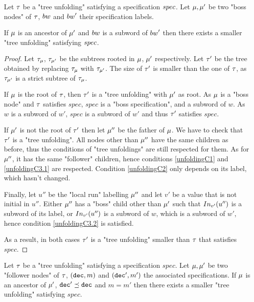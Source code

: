 \begin{lemma}
	Let $\tau$ be a "tree unfolding" satisfying a specification $\spec$.
	Let $\mu, \mu'$ be two "boss nodes" of $\tau$, $\bossspec$ and $\bossspec'$ their specification labels.
	
	If $\mu$ is an ancestor of $\mu'$ and $\bossspec$ is a subword of $\bossspec'$ then there exists a smaller "tree unfolding" satisfying $\spec$.  
\end{lemma}

\ifproofs
\begin{proof}
	Let $\tau_{\mu}$, $\tau_{\mu'}$ be the subtrees rooted in $\mu$, $\mu'$ respectively. 
	Let $\tau'$ be the tree obtained by replacing $\tau_{\mu}$ with $\tau_{\mu'}$. The size of $\tau'$ is smaller than the one of $\tau$, as $\tau_{\mu'}$ is a strict subtree of $\tau_{\mu}$.
	
	If $\mu$ is the root of $\tau$, then $\tau'$ is a "tree unfolding" with $\mu'$ as root. As $\mu$ is a "boss node" and $\tau$ satisfies $spec$, $spec$ is a "boss specification", and a subword of $w$. 
	As $w$ is a subword of $w'$, $spec$ is a subword of $w'$ and thus $\tau'$ satisfies $spec$.
	
	If  $\mu'$ is not the root of $\tau'$ then let $\mu''$ be the father of $\mu$. We have to check that $\tau'$ is a "tree unfolding". 
	All nodes other than $\mu''$ have the same children as before, thus the conditions of "tree unfoldings" are still respected for them.
	As for $\mu''$, it has the same "follower" children, hence conditions \ref{unfoldingC1} and \ref{unfoldingC3.1} are respected. Condition \ref{unfoldingC2} only depends on its label, which hasn't changed.
	
	Finally, let $u''$ be the "local run" labelling $\mu''$ and let $v'$ be a value that is not initial in $u''$. Either $\mu''$ has a "boss" child other than $\mu'$ such that $\vinput{v'}{u''}$ is a subword of its label, or $\vinput{v'}{u''}$ is a subword of $w$, which is a subword of $w'$, hence condition \ref{unfoldingC3.2} is satisfied. 
	
	As a result, in both cases $\tau'$ is a "tree unfolding" smaller than $\tau$ that satisfies $spec$. 
\end{proof}
\fi

\begin{lemma}
	Let $\tau$ be a "tree unfolding" satisfying a specification $spec$.
	Let $\mu, \mu'$ be two "follower nodes" of $\tau$, $(\mathtt{dec},m)$ and $(\mathtt{dec}',m')$ the associated specifications.
	If $\mu$ is an ancestor of $\mu'$, $\mathtt{dec}' \preceq \mathtt{dec}$ and $m=m'$ then there exists a smaller "tree unfolding" satisfying $spec$. 
\end{lemma}

